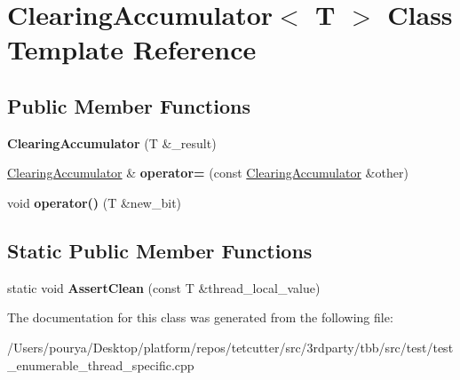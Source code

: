 \hypertarget{classClearingAccumulator}{}\section{Clearing\+Accumulator$<$ T $>$ Class Template Reference}
\label{classClearingAccumulator}
\subsection*{Public Member Functions}
\begin{DoxyCompactItemize}
\item 
\hypertarget{classClearingAccumulator_a5f8b02388322594acd9f8797682fc656}{}{\bfseries Clearing\+Accumulator} (T \&\+\_\+result)\label{classClearingAccumulator_a5f8b02388322594acd9f8797682fc656}

\item 
\hypertarget{classClearingAccumulator_a4c1747d3d77ddab21e047ff44057742a}{}\hyperlink{classClearingAccumulator}{Clearing\+Accumulator} \& {\bfseries operator=} (const \hyperlink{classClearingAccumulator}{Clearing\+Accumulator} \&other)\label{classClearingAccumulator_a4c1747d3d77ddab21e047ff44057742a}

\item 
\hypertarget{classClearingAccumulator_a6dbd2daf28d814c88cc5b73f9c6d203f}{}void {\bfseries operator()} (T \&new\+\_\+bit)\label{classClearingAccumulator_a6dbd2daf28d814c88cc5b73f9c6d203f}

\end{DoxyCompactItemize}
\subsection*{Static Public Member Functions}
\begin{DoxyCompactItemize}
\item 
\hypertarget{classClearingAccumulator_afecbce122585c0a5162e34ba836411d4}{}static void {\bfseries Assert\+Clean} (const T \&thread\+\_\+local\+\_\+value)\label{classClearingAccumulator_afecbce122585c0a5162e34ba836411d4}

\end{DoxyCompactItemize}


The documentation for this class was generated from the following file\+:\begin{DoxyCompactItemize}
\item 
/\+Users/pourya/\+Desktop/platform/repos/tetcutter/src/3rdparty/tbb/src/test/test\+\_\+enumerable\+\_\+thread\+\_\+specific.\+cpp\end{DoxyCompactItemize}
